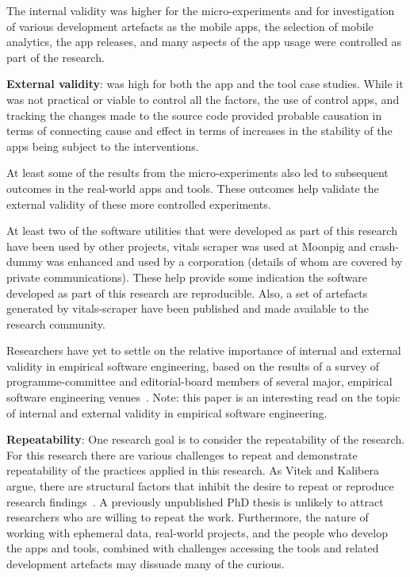 The internal validity was higher for the micro-experiments and for investigation of various development artefacts as the mobile apps, the selection of mobile analytics, the app releases, and many aspects of the app usage were controlled as part of the research.

\textbf{External validity}: was high for both the app and the tool case studies. While it was not practical or viable to control all the factors, the use of control apps, and tracking the changes made to the source code provided probable causation in terms of connecting cause and effect in terms of increases in the stability of the apps being subject to the interventions.

At least some of the results from the micro-experiments also led to subsequent outcomes in the real-world apps and tools. These outcomes help validate the external validity of these more controlled experiments. 

At least two of the software utilities that were developed as part of this research have been used by other projects, vitals scraper was used at Moonpig and crash-dummy was enhanced and used by a corporation (details of whom are covered by private communications). These help provide some indication the software developed as part of this research are reproducible. Also, a set of artefacts generated by vitals-scraper have been published and made available to the research community. 

Researchers have yet to settle on the relative importance of internal and external validity in empirical software engineering, based on the results of a survey of programme-committee and editorial-board members of several major, empirical software engineering venues~\citep[p.4]{sigmund2015_views_on_internal_and_external_validity_in_ESE}. Note: this paper is an interesting read on the topic of internal and external validity in empirical software engineering.



\textbf{Repeatability}: One research goal is to consider the repeatability of the research. For this research there are various challenges to repeat and demonstrate repeatability of the practices applied in this research. As Vitek and Kalibera argue, there are structural factors that inhibit the desire to repeat or reproduce research findings~\citep[p.30]{vivek2012_r3_repeatability_reproducibility_and_rigor}. A previously unpublished PhD thesis is unlikely to attract researchers who are willing to repeat the work. Furthermore, the nature of working with ephemeral data, real-world projects, and the people who develop the apps and tools, combined with challenges accessing the tools and related development artefacts may dissuade many of the curious.

